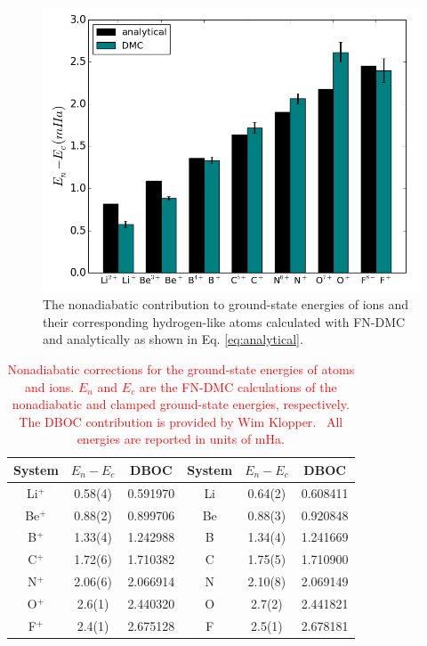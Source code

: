 \documentclass[aip,jcp,numerical,reprint]{revtex4-1}
\begin{document}
\begin{figure}[h]
\includegraphics[scale=.4]{analytical}
\caption{The nonadiabatic contribution to ground-state energies of ions and their corresponding hydrogen-like atoms calculated with FN-DMC and analytically as shown in Eq. \ref{eq:analytical}. \label{fig:analytical}}
\end{figure}

\begin{table}[h]
\setlength{\extrarowheight}{1pt}
\caption{\textcolor{red}{Nonadiabatic corrections for the ground-state energies of atoms and ions. $E_n$ and $E_c$ are the FN-DMC calculations of the nonadiabatic and clamped ground-state energies, respectively. The DBOC contribution is provided by Wim Klopper.~\cite{klop1} All energies are reported in units of mHa.}\label{tab:nad-ad-atoms}}
\begin{tabular}{ccc|ccc}
\hline\hline
System & $E_n-E_c$&  DBOC     & System & $E_n-E_c$&  DBOC \\ \hline
Li$^+$ &  0.58(4) &  0.591970 & Li     &  0.64(2) &  0.608411 \\
Be$^+$ &  0.88(2) &  0.899706 & Be     &  0.88(3) &  0.920848 \\
B$^+$  &  1.33(4) &  1.242988 & B      &  1.34(4) &  1.241669 \\
C$^+$  &  1.72(6) &  1.710382 & C      &  1.75(5) &  1.710900 \\
N$^+$  &  2.06(6) &  2.066914 & N      &  2.10(8) &  2.069149 \\
O$^+$  &  2.6(1)  &  2.440320 & O      &  2.7(2)  &  2.441821 \\
F$^+$  &  2.4(1)  &  2.675128 & F      &  2.5(1)  &  2.678181 \\
\hline\hline
\end{tabular}
\end{table}
\end{document}

